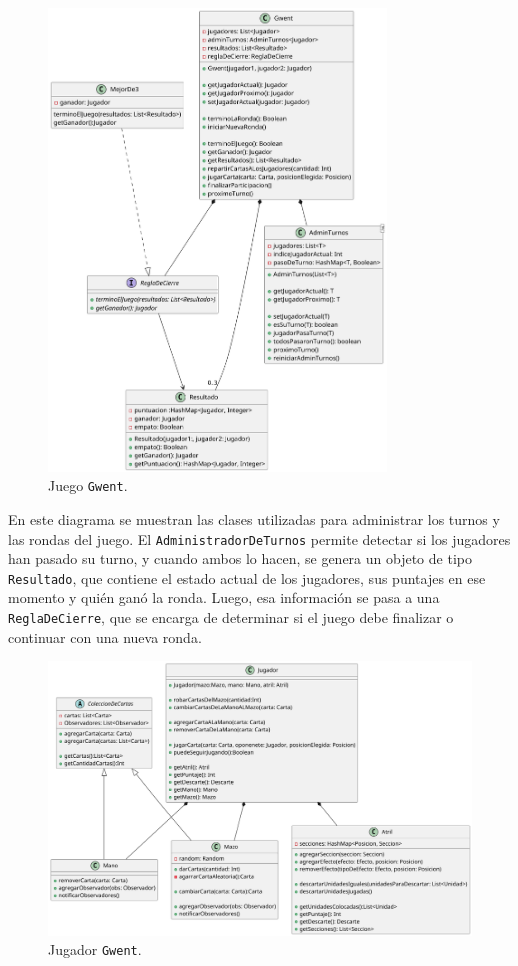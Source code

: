 \documentclass[titlepage,a4paper]{article}
\begin{document}
	\begin{figure}[H]
		\centering
		\includegraphics[width=0.8\textwidth]{diagramas/clases/Gwent}
		\caption{\label{fig:class01}Juego \texttt{Gwent}.}
	\end{figure}

	En este diagrama se muestran las clases utilizadas para administrar los turnos y las rondas del juego.
	El \texttt{AdministradorDeTurnos} permite detectar si los jugadores han pasado su turno, y cuando ambos lo hacen, se genera un objeto de tipo \texttt{Resultado}, que contiene el estado actual de los jugadores, sus puntajes en ese momento y quién ganó la ronda.
	Luego, esa información se pasa a una \texttt{ReglaDeCierre}, que se encarga de determinar si el juego debe finalizar o continuar con una nueva ronda.

	\begin{figure}[H]
		\centering
		\includegraphics[width=1\textwidth]{diagramas/clases/Jugador}
		\caption{\label{fig:class02}Jugador \texttt{Gwent}.}
	\end{figure}
\end{document}
